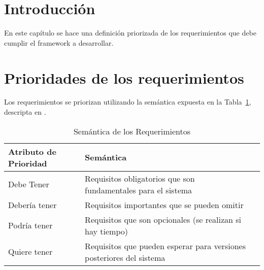 \section{Introducción}
En este capítulo se hace una definición priorizada de los requerimientos que
debe cumplir el framework a desarrollar.
\section {Prioridades de los requerimientos}
    Los requerimientos se priorizan utilizando la semántica expuesta en la
    Tabla~\ref{tab:semantica_requerimientos}, descripta en
    \cite{programacionUml}.

\begin{table}
    \begin{tabularx}{\textwidth}{ | p{2cm} | X | X | }
    \hline
        \textbf{Atributo de Prioridad} & \textbf{Semántica} 
        \\[10pt]\hline
        Debe Tener & Requisitos obligatorios que son fundamentales para el
        sistema
        \\[10pt] \hline
        Debería tener & Requisitos importantes que se pueden omitir
        \\[10pt] \hline
        Podría tener & Requisitos que son opcionales (se realizan si hay tiempo)
        \\[10pt] \hline
        Quiere tener & Requisitos que pueden esperar para versiones posteriores
        del sistema
        \\[10pt] \hline
    \end{tabularx}
    \caption{Semántica de los Requerimientos}
    \label{tab:semantica_requerimientos}
\end{table}
    
